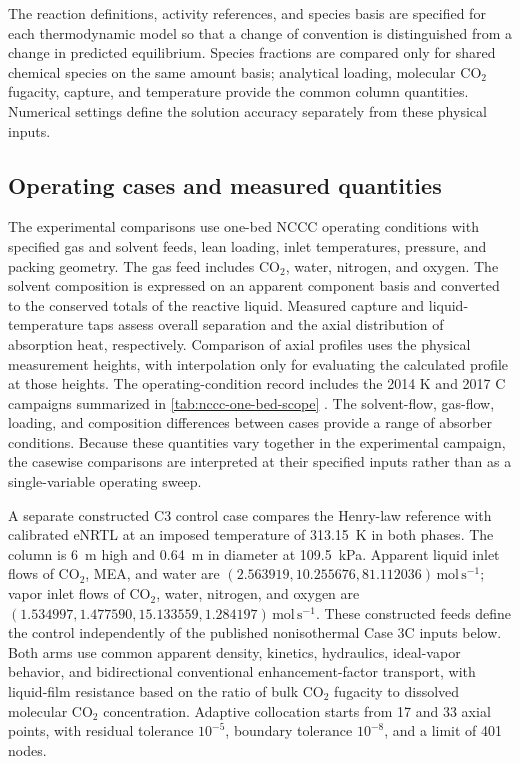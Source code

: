 The reaction definitions, activity references, and species basis are specified for each thermodynamic model so that a change of convention is distinguished from a change in predicted equilibrium.
Species fractions are compared only for shared chemical species on the same amount basis; analytical loading, molecular CO$_2$ fugacity, capture, and temperature provide the common column quantities.
Numerical settings define the solution accuracy separately from these physical inputs.

\subsection{Operating cases and measured quantities}
The experimental comparisons use one-bed NCCC operating conditions with specified gas and solvent feeds, lean loading, inlet temperatures, pressure, and packing geometry.
The gas feed includes CO$_2$, water, nitrogen, and oxygen.
The solvent composition is expressed on an apparent component basis and converted to the conserved totals of the reactive liquid.
Measured capture and liquid-temperature taps assess overall separation and the axial distribution of absorption heat, respectively.
Comparison of axial profiles uses the physical measurement heights, with interpolation only for evaluating the calculated profile at those heights.
The operating-condition record includes the 2014 K and 2017 C campaigns summarized in \cref{tab:nccc-one-bed-scope} \cite{Morgan2018a,Morgan2020}.
The solvent-flow, gas-flow, loading, and composition differences between cases provide a range of absorber conditions.
Because these quantities vary together in the experimental campaign, the casewise comparisons are interpreted at their specified inputs rather than as a single-variable operating sweep.


A separate constructed C3 control case compares the Henry-law reference with calibrated eNRTL at an imposed temperature of \qty{313.15}{K} in both phases.
The column is \qty{6}{m} high and \qty{0.64}{m} in diameter at \qty{109.5}{kPa}.
Apparent liquid inlet flows of CO$_2$, MEA, and water are $(2.563919,10.255676,81.112036)\,\mathrm{mol\,s^{-1}}$; vapor inlet flows of CO$_2$, water, nitrogen, and oxygen are $(1.534997,1.477590,15.133559,1.284197)\,\mathrm{mol\,s^{-1}}$.
These constructed feeds define the control independently of the published nonisothermal Case 3C inputs below.
Both arms use common apparent density, kinetics, hydraulics, ideal-vapor behavior, and bidirectional conventional enhancement-factor transport, with liquid-film resistance based on the ratio of bulk CO$_2$ fugacity to dissolved molecular CO$_2$ concentration.
Adaptive collocation starts from 17 and 33 axial points, with residual tolerance $10^{-5}$, boundary tolerance $10^{-8}$, and a limit of 401 nodes.

